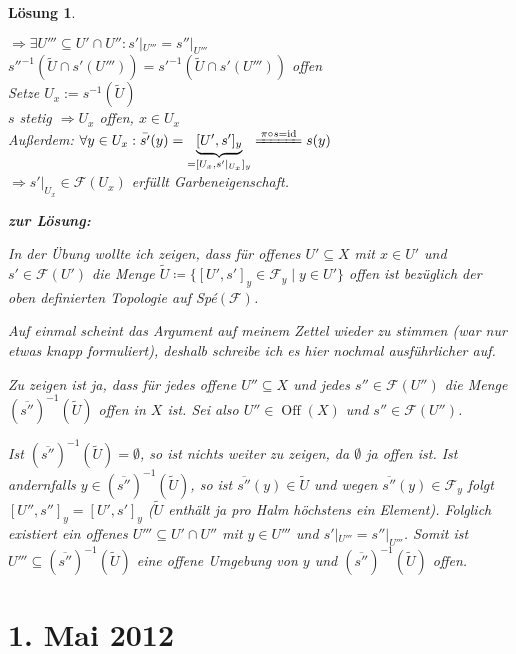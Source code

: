 \documentclass[a4paper, 12pt, numbers=noendperiod, chapterprefix=true]{scrbook}
\theoremstyle{break}
\newtheorem{Loes}{L\"osung}
\theoremstyle{nonumberbreak}
\theoremstyle{nonumberplain}
\newcommand{\quot}[1]{\textrm{\glqq}{#1}\textrm{\grqq}}
\newenvironment{twosidedproof}{\begin{enumerate}[\quot{$\Rightarrow$}:]}{\end{enumerate}}
\DeclareMathOperator{\Off}{Off}
\DeclareMathOperator{\id}{id}
\newcommand{\calF}{\mathcal{F}}
\begin{document}
\begin{Loes}
\begin{twosidedproof}
  $\Rightarrow \exists U''' \subseteq U'\cap U'': s'|_{U'''} = s''|_{U'''}$\\
  $s''^{-1}(\widetilde U \cap s'(U''')) = s'^{-1}(\widetilde U \cap s'(U'''))$ offen\\
  Setze $U_x:= s^{-1}(\widetilde U)$\\
  $s$ stetig $\Rightarrow U_x$ offen, $x\in U_x$\\
  Au\ss erdem: $\forall y \in U_x: \bar{s'}(y) = \underbrace{[U', s']_y}_{=[U_x, s'|_{U_x}]_y} \xlongequal{\pi \circ s = \id} s(y)$\\
  $\Rightarrow s'|_{U_x} \in \calF(U_x)$ erf\"ullt Garbeneigenschaft.
\end{twosidedproof}

\textbf{zur L\"osung:}

In der \"Ubung wollte ich zeigen, dass f\"ur offenes $U' \subseteq X$ mit $x \in U'$ und $s' \in \mathcal{F}(U')$ die Menge $\tilde{U} \coloneqq \{ [U',s']_y \in \mathcal{F}_y \mid y \in U' \}$ offen ist bez\"uglich der oben definierten Topologie auf Sp\'e$(\mathcal{F})$.

Auf einmal scheint das Argument auf meinem Zettel wieder zu stimmen (war nur etwas knapp formuliert), deshalb schreibe ich es hier nochmal ausf\"uhrlicher auf.

Zu zeigen ist ja, dass f\"ur jedes offene $U'' \subseteq X$ und jedes $s'' \in \mathcal{F}(U'')$ die Menge $\left(\overline{s''}\right)^{-1}\left(\tilde{U}\right)$ offen in $X$ ist. Sei also $U'' \in \Off(X)$ und $s'' \in \mathcal{F}(U'')$.

Ist $\left(\overline{s''}\right)^{-1}\left(\tilde{U}\right) = \emptyset$, so ist nichts weiter zu zeigen, da $\emptyset$ ja offen ist. Ist andernfalls $y \in \left(\overline{s''}\right)^{-1}\left(\tilde{U}\right)$, so ist $ \overline{s''}(y) \in \tilde{U}$ und wegen $\overline{s''}(y) \in \mathcal{F}_y$ folgt $[U'',s'']_y = [U',s']_y$ ($\tilde{U}$ enth\"alt ja pro Halm h\"ochstens ein Element). Folglich existiert ein offenes $U''' \subseteq U' \cap U''$ mit $y \in U'''$ und $s'|_{U'''} = s''|_{U'''}$. Somit ist $U''' \subseteq \left(\overline{s''}\right)^{-1}\left(\tilde{U}\right)$ eine offene Umgebung von $y$ und $\left(\overline{s''}\right)^{-1}\left(\tilde{U}\right)$ offen.

\end{Loes}

\newpage
\section{1. Mai 2012}
\setcounter{Aufg}{0}
\setcounter{Loes}{0}
\end{document}
